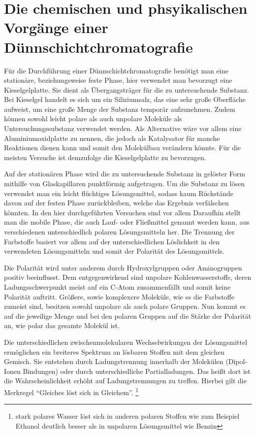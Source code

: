 \documentclass[11pt]{scrreprt}
\begin{document}
 \section{Die chemischen und phsyikalischen Vorgänge einer Dünnschichtchromatografie}
 Für die Durchführung einer Dünnschichtchromatografie benötigt man eine stationäre, beziehungsweise feste Phase, hier verwendet man bevorzugt eine Kieselgelplatte. Sie dient als Übergangsträger für die zu untersuchende Substanz.
Bei Kieselgel handelt es sich um ein Siliziumsalz, das eine sehr große Oberfläche aufweist, um eine große Menge der Substanz temporär aufzunehmen. Zudem können sowohl leicht polare als auch unpolare Moleküle als Untersuchungssubstanz verwendet werden. Als Alternative wäre vor allem eine Aluminiumoxidplatte zu nennen, die jedoch als Katalysator für manche Reaktionen dienen kann und somit den Molekülbau verändern könnte. Für die meisten Versuche ist demzufolge die Kieselgelplatte zu bevorzugen.

Auf der stationären Phase wird die zu untersuchende Substanz in gelöster Form mithilfe von Glaskapillaren punktförmig aufgetragen. Um die Substanz zu lösen verwendet man ein leicht flüchtiges Lösungsmittel, sodass kaum Rückstände davon auf der festen Phase zurückbleiben, welche das Ergebnis verfälschen könnten. In den hier durchgeführten Versuchen sind vor allem  Daraufhin stellt man die mobile Phase, die auch Lauf- oder Fließmittel genannt werden kann, aus verschiedenen unterschiedlich polaren Lösungsmitteln her. Die Trennung der Farbstoffe basiert vor allem auf der unterschiedlichen Löslichkeit in den verwendeten Lösungsmitteln und somit der Polarität des Lösungsmittels. 

Die Polarität wird unter anderem durch Hydroxylgruppen oder Aminogruppen positiv beeinflusst. Dem entgegenwirkend sind unpolare Kohlenwasserstoffe, deren Ladungsschwerpunkt meist auf ein C-Atom zusammenfällt und somit keine Polarität auftritt. Größere, sowie komplexere Moleküle, wie es die Farbstoffe zumeist sind, besitzen sowohl unpolare als auch polare Gruppen. Nun kommt es auf die jeweilige Menge und  bei den polaren Gruppen auf die Stärke der Polarität an, wie polar das gesamte Molekül ist.


Die unterschiedlichen zwischenmolekularen Wechselwirkungen der Lösungsmittel ermöglichen ein breiteres Spektrum an lösbaren Stoffen mit dem gleichen Gemisch. Sie entstehen durch Ladungstrennung innerhalb der Molekülen (Dipol-Ionen Bindungen) oder durch unterschiedliche Partialladungen. 
Das heißt dort ist die Wahrscheinlichkeit erhöht auf Ladungstrennungen zu treffen. 
Hierbei gilt die Merkregel \enquote{Gleiches löst sich in Gleichem}. \footnote{stark polares Wasser löst sich in anderen polaren Stoffen wie zum Beispiel Ethanol deutlich besser als in unpolaren Lösungsmittel wie Benzin} 
\end{document}

